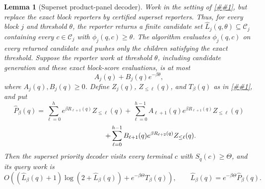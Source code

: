 \documentclass[10pt]{article}
\newcommand{\cref}[1]{\ref{##1}}
\newtheorem{lemma}[theorem]{Lemma}
\theoremstyle{definition}
\begin{document}
\begin{lemma}[Superset product-panel decoder]
   \label{lem:superset-product-panel-decoder}
   Work in the setting of \cref{lem:additive-product-panel-decoder}, but
   replace the exact block reporters by certified superset reporters.  Thus,
   for every block \(j\) and threshold \(\theta\), the reporter returns a
   finite candidate set \(\widehat L_j(q,\theta)\subseteq\mathcal C_j\)
   containing every \(c\in\mathcal C_j\) with
   \(\phi_j(q,c)\ge\theta\).  The algorithm evaluates \(\phi_j(q,c)\) on every
   returned candidate and pushes only the children satisfying the exact
   threshold.  Suppose the reporter work at threshold \(\theta\), including
   candidate generation and these exact block-score evaluations, is at most
   \[
      A_j(q)+B_j(q)e^{-\beta\theta},
      \tag{SR1}
   \]
   where \(A_j(q),B_j(q)\ge0\).  Define \(Z_j(q)\), \(Z_{\le\ell}(q)\), and
   \(T_\beta(q)\) as in \cref{lem:additive-product-panel-decoder}, and put
   \[
      \widehat P_\beta(q)
      =
      \sum_{\ell=0}^{h}
      e^{\beta R_{\ell+1}(q)}Z_{\le\ell}(q)
      +
      \sum_{\ell=0}^{h-1}
      A_{\ell+1}(q)e^{\beta R_{\ell+1}(q)}Z_{\le\ell}(q)
   \]
   \[
      \hspace{2.2cm}
      +
      \sum_{\ell=0}^{h-1}
      B_{\ell+1}(q)e^{\beta R_{\ell+2}(q)}Z_{\le\ell}(q).
   \]
   Then the superset priority decoder visits every terminal
   \(c\) with \(S_q(c)\ge\Theta\), and its query work is
   \[
      O\!\left(
         (\widehat L_\beta(q)+1)\log(2+\widehat L_\beta(q))
         +
         e^{-\beta\Theta}T_\beta(q)
      \right),
      \qquad
      \widehat L_\beta(q)=e^{-\beta\Theta}\widehat P_\beta(q).
   \]
\end{lemma}
\end{document}
